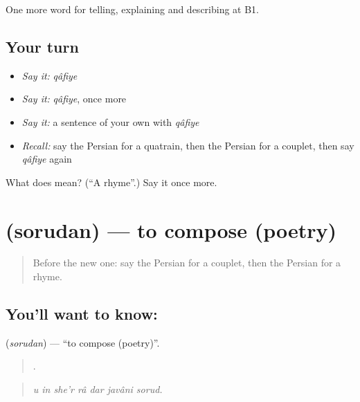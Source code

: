 \begin{grammarlens}[title={What you've built}]
One more word for telling, explaining and describing at B1.
\end{grammarlens}

\subsection*{Your turn}
\begin{itemize}
\raggedright
  \item \emph{Say it:} \emph{qâfiye}
  \item \emph{Say it:} \emph{qâfiye}, once more
  \item \emph{Say it:} a sentence of your own with \emph{qâfiye}
  \item \emph{Recall:} say the Persian for a quatrain, then the Persian for a couplet, then say \emph{qâfiye} again
\end{itemize}

\begin{tcolorbox}[breakable,colback=teal!4,colframe=teal!35!black,title={Before you move on}]
What does  mean? (\textquotedblleft{}A rhyme\textquotedblright{}.) Say it once more.
\end{tcolorbox}
\section[\texorpdfstring{\fa{سرودن} (sorudan)}{سرودن (sorudan)}]{ (sorudan) — to compose (poetry)}

\label{lesson:FA-C522-sorudan}



\begin{quote}
Before the new one: say the Persian for a couplet, then the Persian for a rhyme.
\end{quote}

\subsection*{You'll want to know: }
\textbf{} (\emph{sorudan}) — \textquotedblleft{}to compose (poetry)\textquotedblright{}.

\begin{quote}
      .
\end{quote}

\begin{quote}
\emph{u in she'r râ dar javâni sorud.}
\end{quote}

